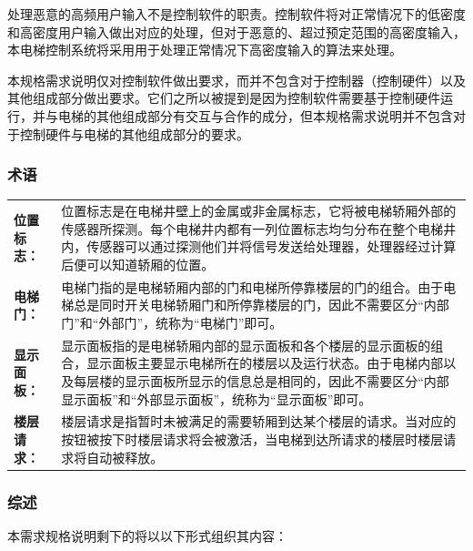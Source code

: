 处理恶意的高频用户输入不是控制软件的职责。控制软件将对正常情况下的低密度和高密度用户输入做出对应的处理，但对于恶意的、超过预定范围的高密度输入，本电梯控制系统将采用用于处理正常情况下高密度输入的算法来处理。\par

本规格需求说明仅对控制软件做出要求，而并不包含对于控制器（控制硬件）以及其他组成部分做出要求。它们之所以被提到是因为控制软件需要基于控制硬件运行，并与电梯的其他组成部分有交互与合作的成分，但本规格需求说明并不包含对于控制硬件与电梯的其他组成部分的要求。

\subsubsection{术语}
\label{sec:terminology}
\begin{flushleft}
\begin{longtable}{>{\flushright\textbf\bgroup}m{}<{\egroup} p{}}
	位置标志： & 位置标志是在电梯井壁上的金属或非金属标志，它将被电梯轿厢外部的传感器所探测。每个电梯井内都有一列位置标志均匀分布在整个电梯井内，传感器可以通过探测他们并将信号发送给处理器，处理器经过计算后便可以知道轿厢的位置。\vspace{1em} \\
	电梯门： & 电梯门指的是电梯轿厢内部的门和电梯所停靠楼层的门的组合。由于电梯总是同时开关电梯轿厢门和所停靠楼层的门，因此不需要区分``内部门''和``外部门''，统称为``电梯门''即可。\vspace{1em} \\
	显示面板： & 显示面板指的是电梯轿厢内部的显示面板和各个楼层的显示面板的组合，显示面板主要显示电梯所在的楼层以及运行状态。由于电梯内部以及每层楼的显示面板所显示的信息总是相同的，因此不需要区分``内部显示面板''和``外部显示面板''，统称为``显示面板''即可。\vspace{1em} \\
	楼层请求： & 楼层请求是指暂时未被满足的需要轿厢到达某个楼层的请求。当对应的按钮被按下时楼层请求将会被激活，当电梯到达所请求的楼层时楼层请求将自动被释放。\vspace{1em} \\
\end{longtable}
\end{flushleft}

\subsubsection{综述}
本需求规格说明剩下的将以以下形式组织其内容：\par

